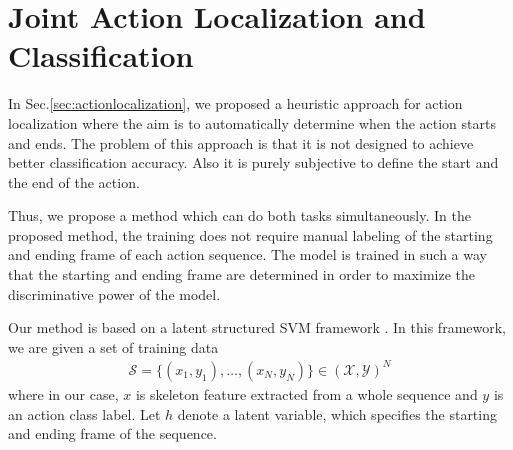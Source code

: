 \documentclass[10pt,twocolumn,letterpaper]{article}
\newcommand{\argmax}{\operatornamewithlimits{argmax}}
\begin{document}



\section{Joint Action Localization and Classification}
In Sec.\ref{sec:actionlocalization}, we proposed a heuristic approach for action localization where the aim is to automatically determine when the action starts and ends. The problem of this approach is that it is not designed to achieve better classification accuracy. Also it is purely subjective to define the start and the end of the action.

Thus, we propose a method which can do both tasks simultaneously. In the proposed method, the training does not require manual labeling of the starting and ending frame of each action sequence. The model is trained in such a way that the starting and ending frame are determined in order to maximize the discriminative power of the model. 

Our method is based on a latent structured SVM framework \cite{LatentSVM}. In this framework, we are given a set of training data
\begin{align*}
\mathcal{S}=\{(x_1,y_1),\dots,(x_N,y_N)\} \in (\mathcal{X},\mathcal{Y})^N
\end{align*}
where in our case, $x$ is skeleton feature extracted from a whole sequence and $y$ is an action class label. Let $h$ denote a latent variable, which specifies the starting and ending frame of the sequence.
\end{document}
